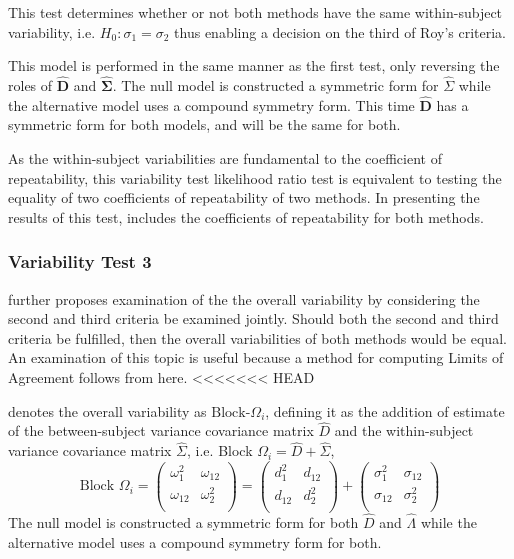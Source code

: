 \documentclass[12pt, a4paper]{report}
\theoremstyle{plain}
\theoremstyle{definition}
\theoremstyle{remark}
\begin{document}
This test determines whether or not both methods have the same within-subject variability, i.e. $H_{0}: \sigma_{1}  = \sigma_{2}$ thus enabling a decision on the third of Roy's criteria.

This model is performed in the same manner as the first test, only reversing the roles of ${\hat{\boldsymbol{D}}}$ and $\boldsymbol{\hat{\Sigma}}$. The null model is constructed a symmetric form for ${\hat{\Sigma}}$ while the alternative model uses a compound symmetry form. This time ${\hat{\boldsymbol{D}}}$ has a symmetric form for both models, and will be the same for both.

As the within-subject variabilities are fundamental to the coefficient of repeatability, this variability test likelihood ratio test is equivalent to testing the equality of two coefficients of repeatability of two methods. In presenting the results of this test, \citet{ARoy2009} includes the coefficients of repeatability for both methods.


\subsubsection{Variability Test 3}
\citet{ARoy2009} further proposes examination of the the overall variability by considering the second and third criteria be examined jointly. Should both the second and third criteria be fulfilled, then the overall variabilities of both methods would be equal. An examination of this topic is useful because a method for computing Limits of Agreement follows from here.
<<<<<<< HEAD
	
 \citet{ARoy2009} denotes the overall variability as ${\mbox{Block-}\Omega_{i}}$, defining it as the addition of estimate of the between-subject variance covariance matrix $\hat{D}$ and the within-subject variance covariance matrix $\hat{\Sigma}$, i.e. Block $\Omega_{i} = \hat{D} + \hat{\Sigma}$,
	\begin{equation}
\mbox{Block } {\Omega}_i = \left(\begin{array}{cc}
		\omega^2_1  & \omega_{12} \\
		\omega_{12} & \omega^2_2 \\
		\end{array}  \right)
		=  \left(
		\begin{array}{cc}
		d^2_1  & d_{12} \\
		d_{12} & d^2_2 \\
		\end{array} \right)+
		\left(
		\begin{array}{cc}
		\sigma^2_1  & \sigma_{12} \\
		\sigma_{12} & \sigma^2_2 \\
		\end{array}\right)
\end{equation}
The null model is constructed a symmetric form for both ${\hat{D}}$ and ${\hat{\Lambda}}$ while the alternative model uses a compound symmetry form for both.
	
\end{document}
